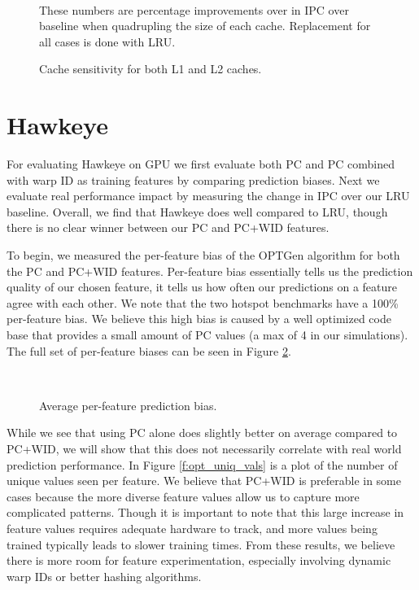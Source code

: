 \begin{figure}[htb]
\begin{center}
\ 
\caption{Cache sensitivity for both L1 and L2 caches.} These numbers are percentage improvements over in IPC over baseline when quadrupling the size of each cache. Replacement for all cases is done with LRU.
\label{f:sensitivity}
\end{center}
\end{figure}
%

\section{Hawkeye}
For evaluating Hawkeye on GPU we first evaluate both PC and PC combined with warp ID as training features by comparing prediction biases. Next we evaluate real performance impact by measuring the change in IPC over our LRU baseline. Overall, we find that Hawkeye does well compared to LRU, though there is no clear winner between our PC and PC+WID features.

To begin, we measured the per-feature bias of the OPTGen algorithm for both the PC and PC+WID features. Per-feature bias essentially tells us the prediction quality of our chosen feature, it tells us how often our predictions on a feature agree with each other. We note that the two hotspot benchmarks have a 100\% per-feature bias. We believe this high bias is caused by a well optimized code base that provides a small amount of PC values (a max of 4 in our simulations). The full set of per-feature biases can be seen in Figure \ref{f:feature_bias}.

\begin{figure}[htb]
\begin{center}
\ 
\caption{Average per-feature prediction bias.}
\label{f:feature_bias}
\end{center}
\end{figure}

While we see that using PC alone does slightly better on average compared to PC+WID, we will show that this does not necessarily correlate with real world prediction performance. In Figure \ref{f:opt_uniq_vals} is a plot of the number of unique values seen per feature. We believe that PC+WID is preferable in some cases because the more diverse feature values allow us to capture more complicated patterns. Though it is important to note that this large increase in feature values requires adequate hardware to track, and more values being trained typically leads to slower training times. From these results, we believe there is more room for feature experimentation, especially involving dynamic warp IDs or better hashing algorithms.


